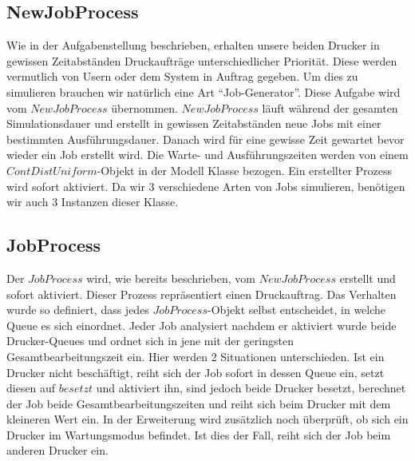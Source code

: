 \documentclass[12pt,a4paper]{article}
\begin{document}
	\subsection{NewJobProcess}
	Wie in der Aufgabenstellung beschrieben, erhalten unsere beiden Drucker in gewissen Zeitabständen Druckaufträge unterschiedlicher Priorität. Diese werden vermutlich von Usern oder dem System
	in Auftrag gegeben. Um dies zu simulieren brauchen wir natürlich eine Art ``Job-Generator''. Diese Aufgabe wird vom $NewJobProcess$ übernommen. $NewJobProcess$ läuft während der gesamten 
	Simulationsdauer und erstellt in gewissen Zeitabständen neue Jobs mit einer bestimmten Ausführungsdauer. Danach wird für eine gewisse Zeit gewartet bevor wieder ein Job erstellt wird. Die Warte-
	und Ausführungszeiten werden von einem $ContDistUniform$-Objekt in der Modell Klasse bezogen. Ein erstellter Prozess wird sofort aktiviert. Da wir 3 verschiedene Arten von Jobs simulieren, benötigen 
	wir auch 3 Instanzen dieser Klasse.
	
	\subsection{JobProcess}
	Der $JobProcess$ wird, wie bereits beschrieben, vom $NewJobProcess$ erstellt und sofort aktiviert. Dieser Prozess repräsentiert einen Druckauftrag. Das Verhalten wurde so definiert, dass jedes
	$JobProcess$-Objekt selbst entscheidet, in welche Queue es sich einordnet. Jeder Job analysiert nachdem er aktiviert wurde beide Drucker-Queues und ordnet sich in jene mit der geringsten
	Gesamtbearbeitungszeit ein. Hier werden 2 Situationen unterschieden. Ist ein Drucker nicht beschäftigt, reiht sich der Job sofort in dessen Queue ein, setzt diesen auf $besetzt$ und aktiviert ihn, sind 
	jedoch beide Drucker besetzt, berechnet der Job beide Gesamtbearbeitungszeiten und reiht sich beim Drucker mit dem kleineren Wert ein. In der Erweiterung wird zusätzlich noch überprüft, ob sich ein 
	Drucker im	Wartungsmodus befindet. Ist dies der Fall, reiht sich der Job beim anderen Drucker ein.
	
\end{document}

